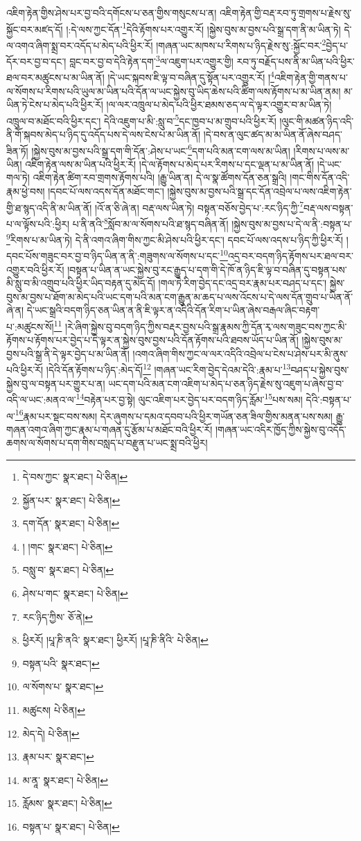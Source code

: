 འཇིག་རྟེན་གྱིས་ཤེས་པར་བྱ་བའི་དགོངས་པ་ཅན་གྱིས་གསུངས་པ་ན། འཇིག་རྟེན་གྱི་བརྡ་རབ་ཏུ་གྲགས་པ་རྗེས་སུ་སྐྱོང་བར་མཛད་དོ། །:དེ་ལས་ཀྱང་དོན་\footnote{དེ་བས་ཀྱང་  སྣར་ཐང་།  པེ་ཅིན། }དེའི་རྟོགས་པར་འགྱུར་རོ། །སྐྱེས་བུས་མ་བྱས་པའི་སྒྲ་དག་ནི་མ་ཡིན་ཏེ། དེ་ལ་འགའ་ཞིག་སྨྲ་བར་འདོད་པ་མེད་པའི་ཕྱིར་རོ། །གཞན་ཡང་མཁས་པ་རིགས་པ་ཉིད་རྗེས་སུ་:སྐྱོང་བར་\footnote{སྐྱོན་པར་  སྣར་ཐང་།  པེ་ཅིན། }བྱེད་པ་དོར་བར་བྱ་བ་དང་། བླང་བར་བྱ་བ་དེའི་རྟེན་དག་\footnote{དག་དོན་  སྣར་ཐང་།  པེ་ཅིན། }ལ་འཇུག་པར་འགྱུར་གྱི། རབ་ཏུ་བརྗོད་པས་ནི་མ་ཡིན་པའི་ཕྱིར་ཐལ་བར་མཚུངས་པ་མ་ཡིན་ནོ། །དེ་ཡང་སྐབས་ཇི་ལྟ་བ་བཞིན་དུ་སྟོན་པར་འགྱུར་རོ། །\footnote{། །གང་  སྣར་ཐང་།  པེ་ཅིན། }འཇིག་རྟེན་གྱི་གནས་པ་ལ་སོགས་པ་རིགས་པའི་ཡུལ་མ་ཡིན་པའི་དོན་ལ་ཡང་སྐྱེས་བུ་ཡིད་ཆེས་པའི་ཚིག་ལས་རྟོགས་པ་མ་ཡིན་ནམ། མ་ཡིན་ཏེ་ངེས་པ་མེད་པའི་ཕྱིར་རོ། །ལ་ལར་འཁྲུལ་པ་མེད་པའི་ཕྱིར་ཐམས་ཅད་ལ་དེ་ལྟར་འགྱུར་བ་མ་ཡིན་ཏེ། འཁྲུལ་བ་མཐོང་བའི་ཕྱིར་དང་། དེའི་འཇུག་པ་མི་:སླུ་བ་\footnote{བསླུ་བ་  སྣར་ཐང་།  པེ་ཅིན། }དང་ཁྱབ་པ་མ་གྲུབ་པའི་ཕྱིར་རོ། །ལུང་གི་མཚན་ཉིད་འདི་ནི་གོ་སྐབས་མེད་པ་ཉིད་དུ་འདོད་པས་དེ་ལས་ངེས་པ་མ་ཡིན་ནོ། །དེ་བས་ན་ལུང་ཚད་མ་མ་ཡིན་ནོ་ཞེས་བཤད་ཟིན་ཏོ། །སྐྱེས་བུས་མ་བྱས་པའི་སྒྲ་དག་གི་དོན་:ཤེས་པ་ཡང་\footnote{ཤེས་པ་གང་  སྣར་ཐང་།  པེ་ཅིན། }དག་པའི་མན་ངག་ལས་མ་ཡིན། །རིགས་པ་ལས་མ་ཡིན། འཇིག་རྟེན་ལས་མ་ཡིན་པའི་ཕྱིར་རོ། །དེ་ལ་རྟོགས་པ་མེད་པར་རིགས་པ་དང་ལྡན་པ་མ་ཡིན་ནོ། །དེ་ཡང་གལ་ཏེ། འཇིག་རྟེན་ཚིག་རབ་གྲགས་རྟོགས་པའི། །རྒྱུ་ཡིན་ན། དེ་ལ་སྣ་ཚོགས་དོན་ཅན་སྒྲའི། །གང་གིས་དོན་འདི་རྣམ་ཕྱེ་བས། །དབང་པོ་ལས་འདས་དོན་མཐོང་གང་། །སྐྱེས་བུས་མ་བྱས་པའི་སྒྲ་དང་དོན་འབྲེལ་པ་ལས་འཇིག་རྟེན་གྱི་ཐ་སྙད་འདི་ནི་མ་ཡིན་ནོ། །འོ་ན་ཅི་ཞེ་ན། བརྡ་ལས་ཡིན་ཏེ། བསྟན་བཅོས་བྱེད་པ་:རང་ཉིད་ཀྱི་\footnote{རང་ཉིད་ཀྱིས་  ཅོ་ནེ། }བརྡ་ལས་བསྟན་པ་ལ་ལྟོས་པའི་:ཕྱིར། པ་ནི་ནའི་\footnote{ཕྱིརརོ། །པཱ་ཎི་ནའི་  སྣར་ཐང་། ཕྱིརརོ། །པཱ་ཎི་ནིའི་  པེ་ཅིན། }སློབ་མ་ལ་སོགས་པའི་ཐ་སྙད་བཞིན་ནོ། །སྐྱེས་བུས་མ་བྱས་པ་དེ་ལ་ནི་:བསྟན་པ་\footnote{བསྟན་པའི་  སྣར་ཐང་། }རིགས་པ་མ་ཡིན་ཏེ། དེ་ནི་འགའ་ཞིག་གིས་ཀྱང་མི་ཤེས་པའི་ཕྱིར་དང་། དབང་པོ་ལས་འདས་པ་ཉིད་ཀྱི་ཕྱིར་རོ། །དབང་པོས་གཟུང་བར་བྱ་བ་ཉིད་ཡིན་ན་ནི་:གཟུགས་ལ་སོགས་པ་དང་\footnote{ལ་སོགས་པ་  སྣར་ཐང་། }འདྲ་བར་བདག་ཉིད་རྟོགས་པར་ཐལ་བར་འགྱུར་བའི་ཕྱིར་རོ། །བསྟན་པ་ཡིན་ན་ཡང་སྐྱེས་བུ་རང་རྒྱུད་པ་དག་གི་དེ་ཁོ་ན་ཉིད་ཇི་ལྟ་བ་བཞིན་དུ་བསྟན་པས་མི་སླུ་བ་མི་འགྲུབ་པའི་ཕྱིར་ཡིད་བརྟན་དུ་མེད་དོ། །གལ་ཏེ་རིག་བྱེད་དང་འདྲ་བར་རྣམ་པར་བཤད་པ་དང་། སྐྱེས་བུས་མ་བྱས་པ་ཐོག་མ་མེད་པའི་ཡང་དག་པའི་མན་ངག་རྒྱུན་མ་ཆད་པ་ལས་འོངས་པ་དེ་ལས་དོན་གྲུབ་པ་ཡིན་ནོ་ཞེ་ན། དེ་ཡང་སྒྲའི་བདག་ཉིད་ཅན་ཡིན་ན་ནི་ཇི་ལྟར་ན་འདིའི་དོན་རིག་པ་ཡིན་ཞེས་བརྒལ་ཞིང་བརྟག་པ་:མཚུངས་སོ།\footnote{མཚུངས།  པེ་ཅིན། } །རེ་ཞིག་སྐྱེས་བུ་བདག་ཉིད་ཀྱིས་བརྡར་བྱས་པའི་སྒྲ་རྣམས་ཀྱི་དོན་རྭ་ལས་གཟུང་བས་ཀྱང་མི་རྟོགས་པ་རྟོགས་པར་བྱེད་པ་དེ་ལྟར་ན་སྐྱེས་བུས་བྱས་པའི་དོན་རྟོགས་པའི་ཐབས་ཡོད་པ་ཡིན་ནོ། །སྐྱེས་བུས་མ་བྱས་པའི་སྒྲ་ནི་དེ་ལྟར་བྱེད་པ་མ་ཡིན་ནོ། །འགའ་ཞིག་གིས་ཀྱང་ལ་ལར་འདིའི་འབྲེལ་པ་ངེས་པ་ཤེས་པར་མི་ནུས་པའི་ཕྱིར་རོ། །དེའི་དོན་རྟོགས་པ་ཉིད་:མེད་དོ།\footnote{མེད་དེ།  པེ་ཅིན། } །གཞན་ཡང་རིག་བྱེད་དེའམ་དེའི་:རྣམ་པ་\footnote{རྣམ་པར་  སྣར་ཐང་། }བཤད་པ་སྐྱེས་བུས་སྐྱེས་བུ་ལ་བསྟན་པར་གྱུར་པ་ན། ཡང་དག་པའི་མན་ངག་འཇིག་པ་མེད་པ་ཅན་ཉིད་རྗེས་སུ་འཇུག་པ་ཞེས་བྱ་བ་འདི་ལ་ཡང་:མནའ་ལ་\footnote{མ་ནཱ་  སྣར་ཐང་།  པེ་ཅིན། }བརྟེན་པར་བྱ་སྟེ། ལུང་འཇིག་པར་བྱེད་པར་བདག་ཉིད་རློམ་\footnote{རློམས་  སྣར་ཐང་།  པེ་ཅིན། }པས་སམ། དེའི་:བསྟན་པ་ལ་\footnote{བསྟན་པ་  སྣར་ཐང་།  པེ་ཅིན། }རྣམ་པར་སྡང་བས་སམ། དེར་ཞུགས་པ་དམའ་དབབ་པའི་ཕྱིར་གཡོན་ཅན་ཟིལ་གྱིས་མནན་པས་སམ། རྒྱུ་གཞན་འགའ་ཞིག་ཀྱང་རྣམ་པ་གཞན་དུ་རྩོམ་པ་མཐོང་བའི་ཕྱིར་རོ། །གཞན་ཡང་འདིར་ཁྱོད་ཀྱིས་སྐྱེས་བུ་འདོད་ཆགས་ལ་སོགས་པ་དག་གིས་བསླད་པ་བརྫུན་པ་ཡང་སྨྲ་བའི་ཕྱིར། 